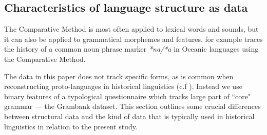 \documentclass[a4paper,10pt]{article} %
\begin{document}






\subsection{Characteristics of language structure as data}
\label{diff_lexi_str}

The Comparative Method is most often applied to lexical words and sounds, but it can also be applied to grammatical morphemes and features. \citet{crowley1985common} for example traces the history of a common noun phrase marker \emph{*na/*a} in Oceanic languages using the Comparative Method. 

The data in this paper does not track specific forms, as is common when reconstructing proto-languages in historical linguistics (c.f \citet{pawley1973some, crowley1985common, evans2003study}). Instead we use binary features of a typological questionnaire which tracks large part of ``core" grammar --- the Grambank dataset. This section outlines some crucial differences between structural data and the kind of data that is typically used in historical linguistics in relation to the present study.
\end{document}
